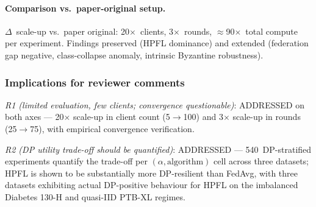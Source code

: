 \documentclass[conference]{IEEEtran}
\begin{document}
\paragraph{Comparison vs.\ paper-original setup.}

\begin{table}[htbp]
\centering
\caption{Setup scale-up from paper original (FLICS submission, March~2026) to Tier~B+ (post-submission, May~2026). The 90$\times$ compute scale-up validates the central thesis at mainstream cross-silo FL scale.}
\label{tab:tier_b_setup_compare}
\small
\setlength{\tabcolsep}{4pt}

\vspace{1mm}
\footnotesize{$\Delta$~scale-up vs.\ paper original: 20$\times$~clients, 3$\times$~rounds, $\approx$90$\times$~total compute per experiment. Findings preserved (HPFL dominance) and extended (federation gap negative, class-collapse anomaly, intrinsic Byzantine robustness).}
\end{table}

\subsubsection*{Implications for reviewer comments}

\emph{R1 (limited evaluation, few clients; convergence questionable)}: ADDRESSED on both axes --- 20$\times$ scale-up in client count (5$\to$100) and 3$\times$ scale-up in rounds (25$\to$75), with empirical convergence verification.

\emph{R2 (DP utility trade-off should be quantified)}: ADDRESSED --- 540~DP-stratified experiments quantify the trade-off per $(\alpha,\text{algorithm})$ cell across three datasets; HPFL is shown to be substantially more DP-resilient than FedAvg, with three datasets exhibiting actual DP-positive behaviour for HPFL on the imbalanced Diabetes 130-H and quasi-IID PTB-XL regimes.
\end{document}

